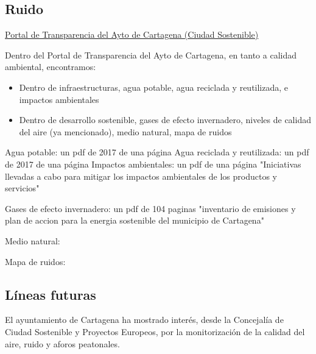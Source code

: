 \documentclass[12pt]{article}
\begin{document}
	\subsection{Ruido}
	
		\href{https://www.cartagena.es/plantillas/14b.asp?pt_idpag=1431}{Portal de Transparencia del Ayto de Cartagena (Ciudad Sostenible)}
	
	Dentro del Portal de Transparencia del Ayto de Cartagena, en tanto a calidad ambiental, encontramos:
	
	\begin{itemize}
		\item Dentro de infraestructuras, agua potable, agua reciclada y reutilizada, e impactos ambientales
		\item Dentro de desarrollo sostenible, gases de efecto invernadero, niveles de calidad del aire (ya mencionado), medio natural, mapa de ruidos
	\end{itemize} 

Agua potable: un pdf de 2017 de una página
Agua reciclada y reutilizada: un pdf de 2017 de una página
Impactos ambientales: un pdf de una página "Iniciativas llevadas a cabo para mitigar los impactos ambientales de los productos y servicios"

Gases de efecto invernadero: un pdf de 104 paginas "inventario de emisiones y plan de accion para la energia sostenible del municipio de Cartagena"

Medio natural: %

Mapa de ruidos: %

		
		\subsection{Líneas futuras}
		
		El ayuntamiento de Cartagena ha mostrado interés, desde la Concejalía de Ciudad Sostenible y Proyectos Europeos, por la monitorización de la calidad del aire, ruido y aforos peatonales.
		
		
	
\end{document}
